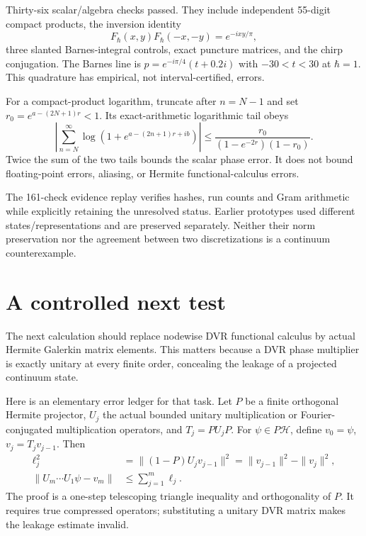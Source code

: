 \documentclass[11pt,a4paper]{article}
\newcommand{\HH}{\mathcal H}
\newcommand{\F}{F_\hbar}
\begin{document}
Thirty-six scalar/algebra checks passed. They include independent
55-digit compact products, the inversion identity
\begin{equation}
 \F(x,y)\F(-x,-y)=e^{-ixy/\pi},
\end{equation}
three slanted Barnes-integral controls, exact puncture matrices,
and the chirp conjugation. The Barnes line is
$p=e^{-i\pi/4}(t+0.2i)$ with $-30<t<30$ at $\hbar=1$.
This quadrature has empirical, not interval-certified, errors.

For a compact-product logarithm, truncate after $n=N-1$ and set
$r_0=e^{a-(2N+1)r}<1$. Its exact-arithmetic logarithmic tail obeys
\begin{equation}
 \left|\sum_{n=N}^\infty\log(1+e^{a-(2n+1)r+ib})\right|
 \leq\frac{r_0}{(1-e^{-2r})(1-r_0)}.
\end{equation}
Twice the sum of the two tails bounds the scalar phase error.
It does not bound floating-point errors, aliasing, or Hermite
functional-calculus errors.

The 161-check evidence replay verifies hashes, run counts and Gram
arithmetic while explicitly retaining the unresolved status.
Earlier prototypes used different states/representations and are
preserved separately. Neither their norm preservation nor the
agreement between two discretizations is a continuum counterexample.
\newpage

\section{A controlled next test}
The next calculation should replace nodewise DVR functional calculus
by actual Hermite Galerkin matrix elements. This matters because a DVR
phase multiplier is exactly unitary at every finite order, concealing
the leakage of a projected continuum state.

Here is an elementary error ledger for that task. Let $P$ be a finite
orthogonal Hermite projector, $U_j$ the actual bounded unitary
multiplication or Fourier-conjugated multiplication operators, and
$T_j=PU_jP$. For $\psi\in P\HH$, define
$v_0=\psi$, $v_j=T_jv_{j-1}$. Then
\begin{align}
 \ell_j^2&=\|(1-P)U_jv_{j-1}\|^2
          =\|v_{j-1}\|^2-\|v_j\|^2,\\
 \|U_m\cdots U_1\psi-v_m\|&\leq\sum_{j=1}^m\ell_j .
 \label{leak}
\end{align}
The proof is a one-step telescoping triangle inequality and
orthogonality of $P$. It requires true compressed operators;
substituting a unitary DVR matrix makes the leakage estimate invalid.
\end{document}
